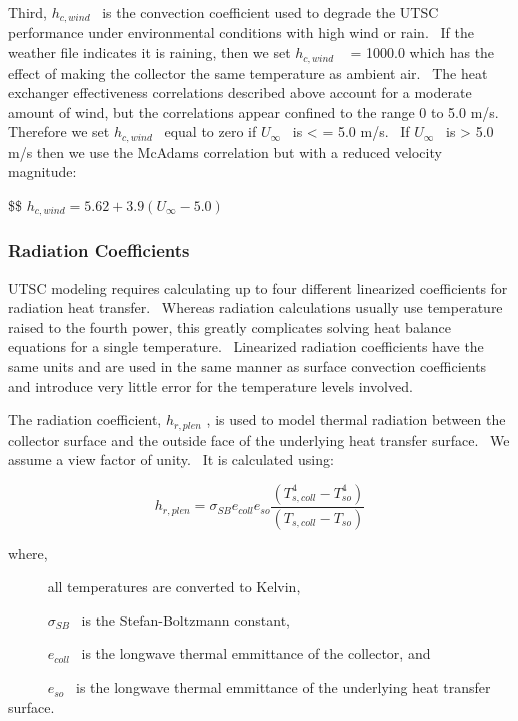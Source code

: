 Third, \({h_{c,wind}}\) ~is the convection coefficient used to degrade the UTSC performance under environmental conditions with high wind or rain.~ If the weather file indicates it is raining, then we set \({h_{c,wind}}\) ~ = 1000.0 which has the effect of making the collector the same temperature as ambient air.~ The heat exchanger effectiveness correlations described above account for a moderate amount of wind, but the correlations appear confined to the range 0 to 5.0 m/s.~ Therefore we set \({h_{c,wind}}\) ~equal to zero if \({U_\infty }\) ~is \textless{} = 5.0 m/s.~ If \({U_\infty }\) ~is \textgreater{} 5.0 m/s then we use the McAdams correlation but with a reduced velocity magnitude:

\$\$ \({h_{c,wind}} = 5.62 + 3.9({U_\infty } - 5.0)\)

\subsubsection{Radiation Coefficients}\label{radiation-coefficients-000}

UTSC modeling requires calculating up to four different linearized coefficients for radiation heat transfer.~ Whereas radiation calculations usually use temperature raised to the fourth power, this greatly complicates solving heat balance equations for a single temperature.~ Linearized radiation coefficients have the same units and are used in the same manner as surface convection coefficients and introduce very little error for the temperature levels involved.

The radiation coefficient, \({h_{r,plen}}\) , is used to model thermal radiation between the collector surface and the outside face of the underlying heat transfer surface.~ We assume a view factor of unity.~ It is calculated using:

\begin{equation}
{h_{r,plen}} = {\sigma_{SB}}{e_{coll}}{e_{so}}\frac{{\left( {T_{s,coll}^4 - T_{so}^4} \right)}}{{\left( {{T_{s,coll}} - {T_{so}}} \right)}}
\end{equation}

where,

~~~~~ all temperatures are converted to Kelvin,

~~~~~ \({\sigma_{SB}}\) ~is the Stefan-Boltzmann constant,

~~~~~ \({e_{coll}}\) ~is the longwave thermal emmittance of the collector, and

~~~~~ \({e_{so}}\) ~is the longwave thermal emmittance of the underlying heat transfer surface.

